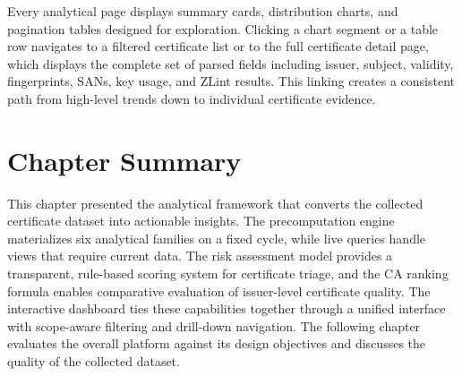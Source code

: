Every analytical page displays summary cards, distribution charts, and
pagination tables designed for exploration. Clicking a chart segment or a
table row navigates to a filtered certificate list or to the full certificate
detail page, which displays the complete set of parsed fields including
issuer, subject, validity, fingerprints, SANs, key usage, and ZLint results.
This linking creates a consistent path from high-level trends down to
individual certificate evidence.

\section{Chapter Summary}

This chapter presented the analytical framework that converts the collected
certificate dataset into actionable insights. The precomputation engine
materializes six analytical families on a fixed cycle, while live queries
handle views that require current data. The risk assessment model provides a
transparent, rule-based scoring system for certificate triage, and the CA
ranking formula enables comparative evaluation of issuer-level certificate
quality. The interactive dashboard ties these capabilities together through a
unified interface with scope-aware filtering and drill-down navigation. The
following chapter evaluates the overall platform against its design objectives
and discusses the quality of the collected dataset.
